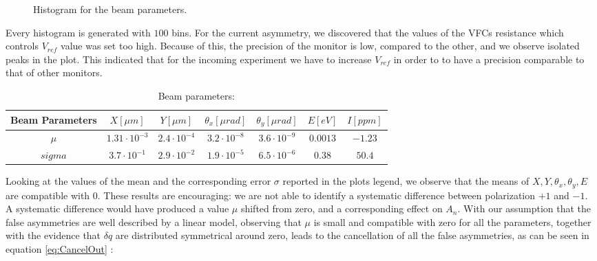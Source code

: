 \begin{figure}[!hbtp]
\caption{Histogram for the beam parameters.}
\label{fig:BeamParameters}
\end{figure}

Every histogram is generated with $100$ bins. For the current asymmetry, we discovered that the values of the VFCs resistance which controls $V_{ref}$ value was set too high. Because of this, the precision of the monitor is low, compared to the other, and we observe isolated peaks in the plot. This indicated that for the incoming experiment we have to increase $V_{ref}$ in order to to have a precision comparable to that of other monitors.

\begin{table}[hbtp]
\centering
\caption{Beam parameters:}
\begin{tabular}{c|c|c|c|c|c|c} 
\hline 
\rule[-1ex]{0pt}{2.5ex} 
Beam Parameters &  $X [\mu m]$ & $Y[\mu m]$ & $ \theta_{x} [\mu rad]$ & $ \theta_{y} [\mu rad]$ & $E [eV]$ & $I [ppm] $ \\ 
\hline 
\rule[-1ex]{0pt}{2.5ex} $\mu$ & $1.31 \cdot 10^{-3}$ & $2.4 \cdot 10^{-4}$ & $3.2 \cdot 10^{-8} $ & $3.6 \cdot 10^{-9}$ & $0.0013$ & $-1.23$ \\ 
\hline 
\rule[-1ex]{0pt}{2.5ex} $sigma$ & $3.7 \cdot 10^{-1}$ & $2.9 \cdot 10^{-2}$ & $ 1.9 \cdot 10^{-5} $ & $6.5 \cdot 10^{-6}$ & $0.38$  & $50.4$ \\ 
\hline 
\end{tabular}
\label{Tab:parametri} 
\end{table}

Looking at the values of the mean and the corresponding error $\sigma$ reported in the plots legend, we observe that the means of $X,Y,\theta_{x},\theta_{y},E$ are compatible with $0$. These results are encouraging: we are not able to identify a systematic difference between polarization $+1$ and $-1$. A systematic difference would have produced a value $\mu$ shifted from zero, and a corresponding effect on $A_{n}$. 
With our assumption that the false asymmetries are well described by a linear model, observing that $\mu$ is small and compatible with zero for all the parameters, together with the evidence that $\delta q$ are distributed symmetrical around zero, leads to the cancellation of all the false asymmetries, as can be seen in equation \ref{eq:CancelOut} :

